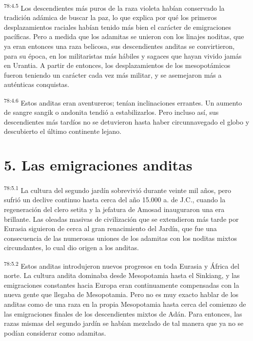 \par
\textsuperscript{78:4.5} Los descendientes más puros de la raza violeta habían conservado la tradición adámica de buscar la paz, lo que explica por qué los primeros desplazamientos raciales habían tenido más bien el carácter de emigraciones pacíficas. Pero a medida que los adamitas se unieron con los linajes noditas, que ya eran entonces una raza belicosa, sus descendientes anditas se convirtieron, para su época, en los militaristas más hábiles y sagaces que hayan vivido jamás en Urantia. A partir de entonces, los desplazamientos de los mesopotámicos fueron teniendo un carácter cada vez más militar, y se asemejaron más a auténticas conquistas.

\par
\textsuperscript{78:4.6} Estos anditas eran aventureros; tenían inclinaciones errantes. Un aumento de sangre sangik o andonita tendió a estabilizarlos. Pero incluso así, sus descendientes más tardíos no se detuvieron hasta haber circunnavegado el globo y descubierto el último continente lejano.

\section*{5. Las emigraciones anditas}
\par
\textsuperscript{78:5.1} La cultura del segundo jardín sobrevivió durante veinte mil años, pero sufrió un declive continuo hasta cerca del año 15.000 a. de J.C., cuando la regeneración del clero setita y la jefatura de Amosad inauguraron una era brillante. Las oleadas masivas de civilización que se extendieron más tarde por Eurasia siguieron de cerca al gran renacimiento del Jardín, que fue una consecuencia de las numerosas uniones de los adamitas con los noditas mixtos circundantes, lo cual dio origen a los anditas.

\par
\textsuperscript{78:5.2} Estos anditas introdujeron nuevos progresos en toda Eurasia y
África del norte. La cultura andita dominaba desde Mesopotamia hasta el Sinkiang, y las emigraciones constantes hacia Europa eran continuamente compensadas con la nueva gente que llegaba de Mesopotamia. Pero no es muy exacto hablar de los anditas como de una raza en la propia Mesopotamia hasta cerca del comienzo de las emigraciones finales de los descendientes mixtos de Adán. Para entonces, las razas mismas del segundo jardín se habían mezclado de tal manera que ya no se podían considerar como adamitas.

